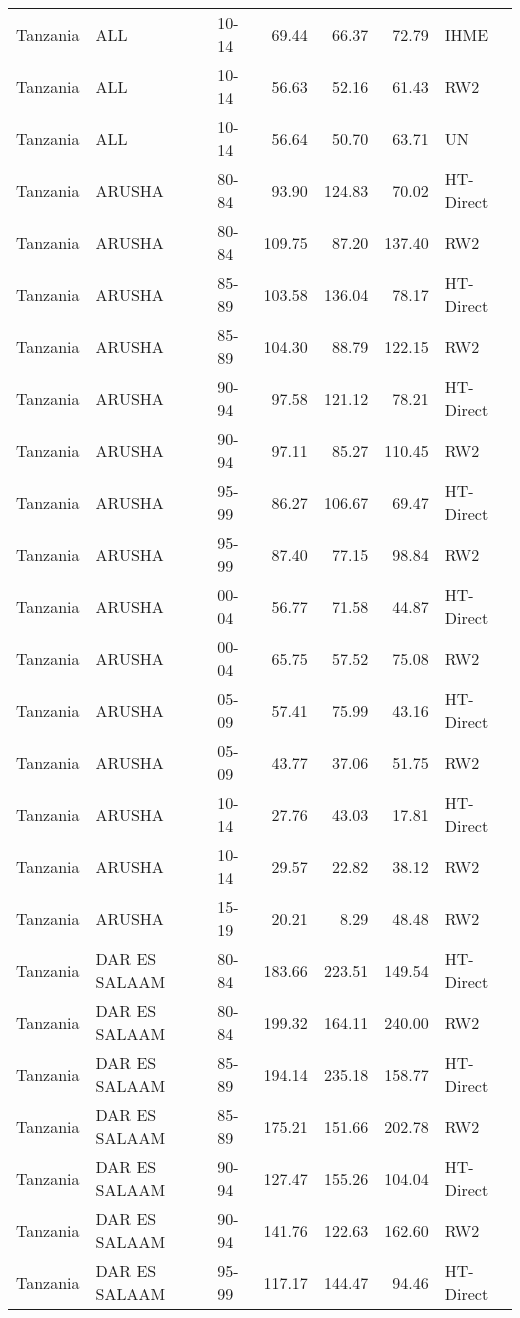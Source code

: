 \begin{longtable}{lllrrrl}
  Tanzania & ALL & 10-14 & 69.44 & 66.37 & 72.79 & IHME \\ 
  Tanzania & ALL & 10-14 & 56.63 & 52.16 & 61.43 & RW2 \\ 
  Tanzania & ALL & 10-14 & 56.64 & 50.70 & 63.71 & UN \\ 
  Tanzania & ARUSHA & 80-84 & 93.90 & 124.83 & 70.02 & HT-Direct \\ 
  Tanzania & ARUSHA & 80-84 & 109.75 & 87.20 & 137.40 & RW2 \\ 
  Tanzania & ARUSHA & 85-89 & 103.58 & 136.04 & 78.17 & HT-Direct \\ 
  Tanzania & ARUSHA & 85-89 & 104.30 & 88.79 & 122.15 & RW2 \\ 
  Tanzania & ARUSHA & 90-94 & 97.58 & 121.12 & 78.21 & HT-Direct \\ 
  Tanzania & ARUSHA & 90-94 & 97.11 & 85.27 & 110.45 & RW2 \\ 
  Tanzania & ARUSHA & 95-99 & 86.27 & 106.67 & 69.47 & HT-Direct \\ 
  Tanzania & ARUSHA & 95-99 & 87.40 & 77.15 & 98.84 & RW2 \\ 
  Tanzania & ARUSHA & 00-04 & 56.77 & 71.58 & 44.87 & HT-Direct \\ 
  Tanzania & ARUSHA & 00-04 & 65.75 & 57.52 & 75.08 & RW2 \\ 
  Tanzania & ARUSHA & 05-09 & 57.41 & 75.99 & 43.16 & HT-Direct \\ 
  Tanzania & ARUSHA & 05-09 & 43.77 & 37.06 & 51.75 & RW2 \\ 
  Tanzania & ARUSHA & 10-14 & 27.76 & 43.03 & 17.81 & HT-Direct \\ 
  Tanzania & ARUSHA & 10-14 & 29.57 & 22.82 & 38.12 & RW2 \\ 
  Tanzania & ARUSHA & 15-19 & 20.21 & 8.29 & 48.48 & RW2 \\ 
  Tanzania & DAR ES SALAAM & 80-84 & 183.66 & 223.51 & 149.54 & HT-Direct \\ 
  Tanzania & DAR ES SALAAM & 80-84 & 199.32 & 164.11 & 240.00 & RW2 \\ 
  Tanzania & DAR ES SALAAM & 85-89 & 194.14 & 235.18 & 158.77 & HT-Direct \\ 
  Tanzania & DAR ES SALAAM & 85-89 & 175.21 & 151.66 & 202.78 & RW2 \\ 
  Tanzania & DAR ES SALAAM & 90-94 & 127.47 & 155.26 & 104.04 & HT-Direct \\ 
  Tanzania & DAR ES SALAAM & 90-94 & 141.76 & 122.63 & 162.60 & RW2 \\ 
  Tanzania & DAR ES SALAAM & 95-99 & 117.17 & 144.47 & 94.46 & HT-Direct \\ 

\end{longtable}
